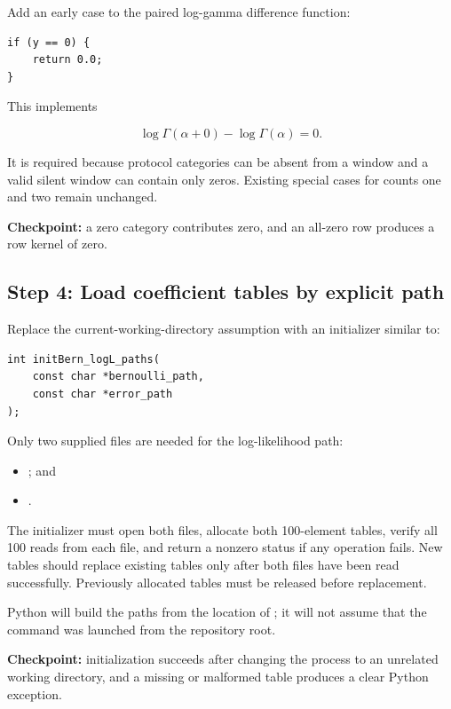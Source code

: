 \documentclass[11pt,a4paper]{article}
\begin{document}
Add an early case to the paired log-gamma difference function:

\begin{verbatim}
if (y == 0) {
    return 0.0;
}
\end{verbatim}

This implements

\[
\log\Gamma(\alpha+0)-\log\Gamma(\alpha)=0.
\]

It is required because protocol categories can be absent from a window and a
valid silent window can contain only zeros. Existing special cases for counts
one and two remain unchanged.

\textbf{Checkpoint:} a zero category contributes zero, and an all-zero row
produces a row kernel of zero.

\subsection{Step 4: Load coefficient tables by explicit path}

Replace the current-working-directory assumption with an initializer similar
to:

\begin{verbatim}
int initBern_logL_paths(
    const char *bernoulli_path,
    const char *error_path
);
\end{verbatim}

Only two supplied files are needed for the log-likelihood path:

\begin{itemize}

\item {}; and

\item {}.

\end{itemize}

The initializer must open both files, allocate both 100-element tables, verify
all 100 reads from each file, and return a nonzero status if any operation
fails. New tables should replace existing tables only after both files have
been read successfully. Previously allocated tables must be released before
replacement.

Python will build the paths from the location of ; it will
not assume that the command was launched from the repository root.

\textbf{Checkpoint:} initialization succeeds after changing the process to an
unrelated working directory, and a missing or malformed table produces a clear
Python exception.
\end{document}
